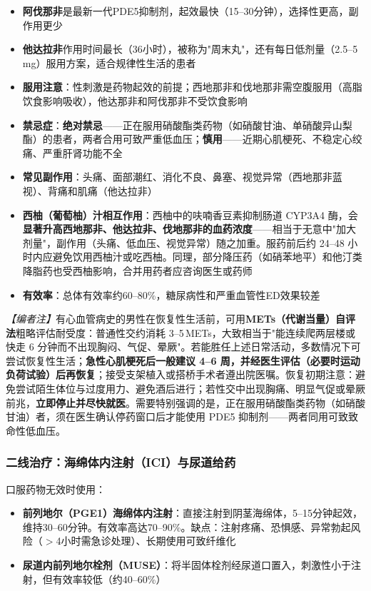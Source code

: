 \begin{itemize}[leftmargin=2cm]
	\item \textbf{阿伐那非}是最新一代PDE5抑制剂，起效最快（15--30分钟），选择性更高，副作用更少
	\item \textbf{他达拉非}作用时间最长（36小时），被称为"周末丸"，还有每日低剂量（2.5--5 mg）服用方案，适合规律性生活的患者
	\item \textbf{服用注意}：性刺激是药物起效的前提；西地那非和伐地那非需空腹服用（高脂饮食影响吸收），他达那非和阿伐那非不受饮食影响
	\item \textbf{禁忌症}：\textbf{绝对禁忌}——正在服用硝酸酯类药物（如硝酸甘油、单硝酸异山梨酯）的患者，两者合用可致严重低血压；\textbf{慎用}——近期心肌梗死、不稳定心绞痛、严重肝肾功能不全
	\item \textbf{常见副作用}：头痛、面部潮红、消化不良、鼻塞、视觉异常（西地那非蓝视）、背痛和肌痛（他达拉非）
	\item \textbf{西柚（葡萄柚）汁相互作用}：西柚中的呋喃香豆素抑制肠道 CYP3A4 酶，会\textbf{显著升高西地那非、他达拉非、伐地那非的血药浓度}——相当于无意中"加大剂量"，副作用（头痛、低血压、视觉异常）随之加重。服药前后约 24--48 小时内应避免饮用西柚汁或吃西柚。同理，部分降压药（如硝苯地平）和他汀类降脂药也受西柚影响，合并用药者应咨询医生或药师
	\item \textbf{有效率}：总体有效率约60--80\%，糖尿病性和严重血管性ED效果较差
\end{itemize}

\noindent\textit{【编者注】}有心血管病史的男性在恢复性生活前，可用\textbf{METs（代谢当量）自评法}粗略评估耐受度：普通性交约消耗 3--5\,METs，大致相当于"能连续爬两层楼或快走 6 分钟而不出现胸闷、气促、晕厥"。若能胜任上述日常活动，多数情况下可尝试恢复性生活；\textbf{急性心肌梗死后一般建议 4--6 周，并经医生评估（必要时运动负荷试验）后再恢复}；接受支架植入或搭桥手术者遵出院医嘱。恢复初期注意：避免尝试陌生体位与过度用力、避免酒后进行；若性交中出现胸痛、明显气促或晕厥前兆，\textbf{立即停止并尽快就医}。需要特别强调的是，正在服用硝酸酯类药物（如硝酸甘油）者，须在医生确认停药窗口后才能使用 PDE5 抑制剂——两者同用可致致命性低血压。

\subsubsection{二线治疗：海绵体内注射（ICI）与尿道给药}

口服药物无效时使用：
\begin{itemize}[leftmargin=2cm]
	\item \textbf{前列地尔（PGE1）海绵体内注射}：直接注射到阴茎海绵体，5--15分钟起效，维持30--60分钟。有效率高达70--90\%。缺点：注射疼痛、恐惧感、异常勃起风险（$>$4小时需急诊处理）、长期使用可致纤维化
	\item \textbf{尿道内前列地尔栓剂（MUSE）}：将半固体栓剂经尿道口置入，刺激性小于注射，但有效率较低（约40--60\%）
\end{itemize}

